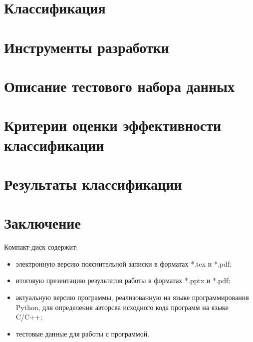 \newpage  
\section{Классификация}\label{classifiers}


\newpage  
\section{Инструменты разработки}


% 


\newpage 
\section{Описание тестового набора данных}\label{test_data}


\section{Критерии оценки эффективности классификации}\label{eval}


\newpage 
\section{Результаты классификации}

 
 
 \newpage
\section*{Заключение}

 
 
 \newpage
 \renewcommand{\refname}{Список использованных источников}
 

 Компакт-диск содержит: 
 \begin{itemize}
 \item электронную версию пояснительной записки в форматах *.tex и *.pdf;
 \item итоговую презентацию результатов работы в форматах *.pptx и *.pdf;
 \item актуальную версию программы, реализованную на языке программирования Python, для определения авторсва исходного кода программ на языке C/C++;
 \item тестовые данные для работы с программой.
 \end{itemize}
 
 
 
 
 

